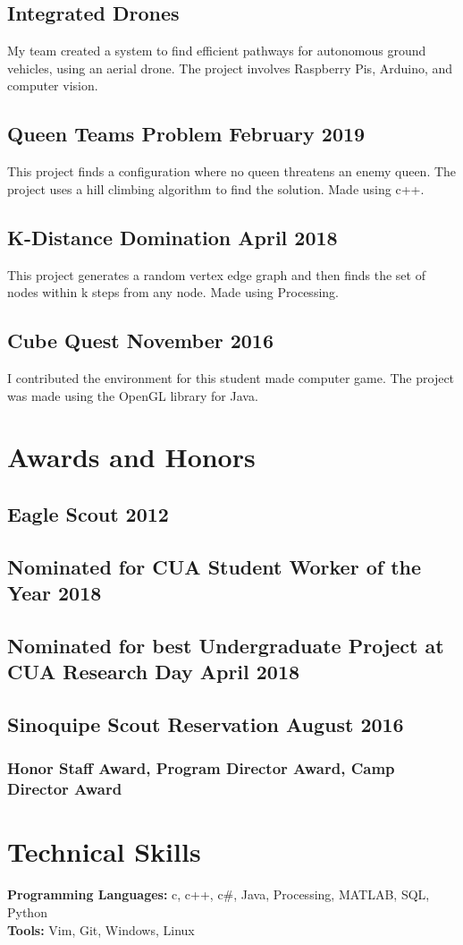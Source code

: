 \documentclass{article}
\begin{document}
\subsection {Integrated Drones}
My team created a system to find efficient pathways for autonomous ground vehicles, using an aerial drone.
The project involves Raspberry Pis, Arduino, and computer vision.

\subsection{Queen Teams Problem \hfill February 2019}
This project finds a configuration where no queen threatens an enemy queen.
The project uses a hill climbing algorithm to find the solution.
Made using c++.

\subsection{K-Distance Domination \hfill April 2018}
This project generates a random vertex edge graph and then finds the set of nodes within k steps from any node.
Made using Processing.

\subsection{Cube Quest \hfill November 2016}
I contributed the environment for this student made computer game.
The project was made using the OpenGL library for Java.


\section{Awards and Honors}
\subsection{Eagle Scout \hfill 2012}
\subsection{Nominated for CUA Student Worker of the Year \hfill 2018}
\subsection{Nominated for best Undergraduate Project at CUA Research Day \hfill April 2018}
\subsection{Sinoquipe Scout Reservation \hfill August 2016}
\subsubsection{Honor Staff Award, Program Director Award, Camp Director Award}

\section{Technical Skills}

\textbf{Programming Languages:}
c,
c++,
c\#,
Java,
Processing,
MATLAB,
SQL,
Python \\
\textbf{Tools:}
Vim,
Git,
Windows,
Linux
\end{document}
